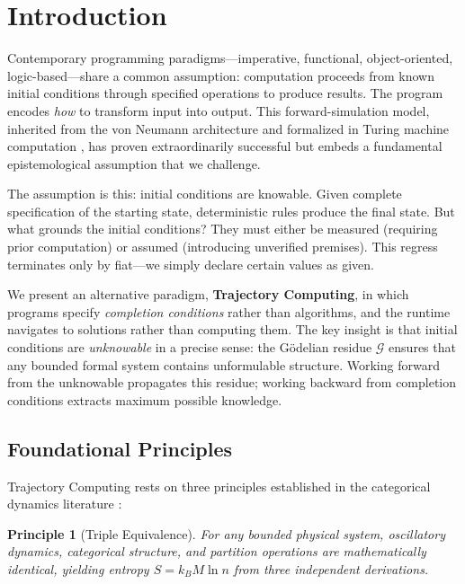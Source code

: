 \documentclass[twocolumn,10pt]{article}
\newtheorem{principle}[theorem]{Principle}
\theoremstyle{remark}
\newcommand{\Gres}{\mathcal{G}}
\begin{document}
\section{Introduction}
\label{sec:introduction}

Contemporary programming paradigms---imperative, functional, object-oriented, logic-based---share a common assumption: computation proceeds from known initial conditions through specified operations to produce results. The program encodes \textit{how} to transform input into output. This forward-simulation model, inherited from the von Neumann architecture \cite{vonneumann1945first} and formalized in Turing machine computation \cite{turing1936computable}, has proven extraordinarily successful but embeds a fundamental epistemological assumption that we challenge.

The assumption is this: initial conditions are knowable. Given complete specification of the starting state, deterministic rules produce the final state. But what grounds the initial conditions? They must either be measured (requiring prior computation) or assumed (introducing unverified premises). This regress terminates only by fiat---we simply declare certain values as given.

We present an alternative paradigm, \textbf{Trajectory Computing}, in which programs specify \textit{completion conditions} rather than algorithms, and the runtime navigates to solutions rather than computing them. The key insight is that initial conditions are \textit{unknowable} in a precise sense: the Gödelian residue $\Gres$ ensures that any bounded formal system contains unformulable structure. Working forward from the unknowable propagates this residue; working backward from completion conditions extracts maximum possible knowledge.

\subsection{Foundational Principles}

Trajectory Computing rests on three principles established in the categorical dynamics literature \cite{poincare2024computing, sachikonye2024derivation}:

\begin{principle}[Triple Equivalence]
\label{prin:triple}
For any bounded physical system, oscillatory dynamics, categorical structure, and partition operations are mathematically identical, yielding entropy $S = k_B M \ln n$ from three independent derivations.
\end{principle}
\end{document}
